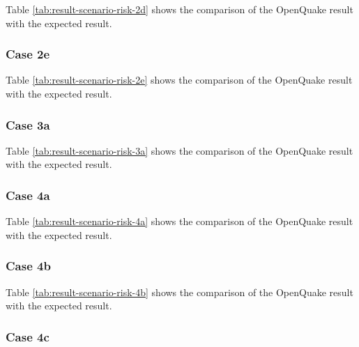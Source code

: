 

Table \ref{tab:result-scenario-risk-2d} shows the comparison of the OpenQuake result with the expected result.

\subsubsection{Case 2e}




Table \ref{tab:result-scenario-risk-2e} shows the comparison of the OpenQuake result with the expected result.

\subsubsection{Case 3a}




Table \ref{tab:result-scenario-risk-3a} shows the comparison of the OpenQuake result with the expected result.

\subsubsection{Case 4a}




Table \ref{tab:result-scenario-risk-4a} shows the comparison of the OpenQuake result with the expected result.

\subsubsection{Case 4b}




Table \ref{tab:result-scenario-risk-4b} shows the comparison of the OpenQuake result with the expected result.

\subsubsection{Case 4c}


